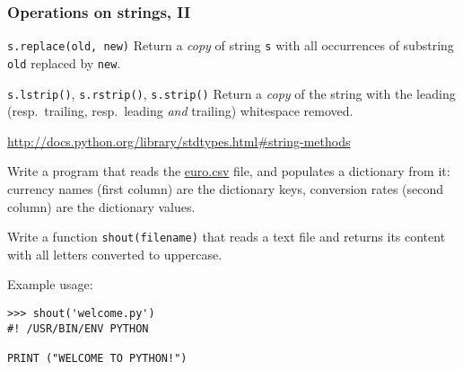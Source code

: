 \documentclass[english,serif,mathserif,xcolor=pdftex,dvipsnames,table]{beamer}
\begin{document}
\begin{frame}[fragile]
  \frametitle{Operations on strings, II}
  \begin{describe}{\lstinline|s.replace(old, new)|}
    Return a \emph{copy} of string \texttt{s} with all occurrences of
    substring \texttt{old} replaced by \texttt{new}.
  \end{describe}

  \begin{describe}{%
      \lstinline|s.lstrip()|,
      \lstinline|s.rstrip()|,
      \lstinline|s.strip()|}
    Return a \emph{copy} of the string with the leading (resp.\ trailing,
    resp.\ leading \emph{and} trailing) whitespace removed.
  \end{describe}

  \begin{references}
    \url{http://docs.python.org/library/stdtypes.html#string-methods}
  \end{references}
\end{frame}


\begin{frame}[fragile]
  \begin{exercise}
    Write a program that reads the \href{http://www.gc3.uzh.ch/euro.csv}{euro.csv} file, and populates a dictionary from it: currency names (first column) are the dictionary keys, conversion rates (second column) are the dictionary values.
  \end{exercise}

  \+
  \begin{exercise}
    Write a function \lstinline|shout(filename)| that reads a text file and
    returns its content with all letters converted to uppercase.

    \+
    Example usage:
\begin{lstlisting}
>>> shout('welcome.py')
#! /USR/BIN/ENV PYTHON

PRINT ("WELCOME TO PYTHON!")
\end{lstlisting}
  \end{exercise}
\end{frame}
\end{document}
